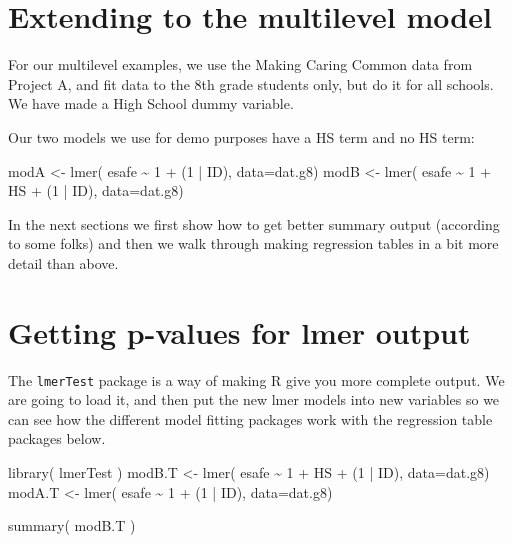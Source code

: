 \documentclass[
  letterpaper,
  DIV=11,
  numbers=noendperiod]{scrreprt}
\newenvironment{Shaded}{}{}
\newcommand{\AttributeTok}[1]{\textcolor[rgb]{0.49,0.56,0.16}{#1}}
\newcommand{\DecValTok}[1]{\textcolor[rgb]{0.25,0.63,0.44}{#1}}
\newcommand{\FunctionTok}[1]{\textcolor[rgb]{0.02,0.16,0.49}{#1}}
\newcommand{\NormalTok}[1]{#1}
\newcommand{\OtherTok}[1]{\textcolor[rgb]{0.00,0.44,0.13}{#1}}
\newcommand{\SpecialCharTok}[1]{\textcolor[rgb]{0.25,0.44,0.63}{#1}}
\begin{document}
\section{Extending to the multilevel
model}\label{extending-to-the-multilevel-model}

For our multilevel examples, we use the Making Caring Common data from
Project A, and fit data to the 8th grade students only, but do it for
all schools. We have made a High School dummy variable.

Our two models we use for demo purposes have a HS term and no HS term:

\begin{Shaded}
\begin{Highlighting}[]
\NormalTok{modA }\OtherTok{\textless{}{-}} \FunctionTok{lmer}\NormalTok{( esafe }\SpecialCharTok{\textasciitilde{}} \DecValTok{1} \SpecialCharTok{+}\NormalTok{ (}\DecValTok{1} \SpecialCharTok{|}\NormalTok{ ID), }\AttributeTok{data=}\NormalTok{dat.g8)}
\NormalTok{modB }\OtherTok{\textless{}{-}} \FunctionTok{lmer}\NormalTok{( esafe }\SpecialCharTok{\textasciitilde{}} \DecValTok{1} \SpecialCharTok{+}\NormalTok{ HS }\SpecialCharTok{+}\NormalTok{ (}\DecValTok{1} \SpecialCharTok{|}\NormalTok{ ID), }\AttributeTok{data=}\NormalTok{dat.g8)}
\end{Highlighting}
\end{Shaded}

In the next sections we first show how to get better summary output
(according to some folks) and then we walk through making regression
tables in a bit more detail than above.

\section{Getting p-values for lmer
output}\label{getting-p-values-for-lmer-output}

The \texttt{lmerTest} package is a way of making R give you more
complete output. We are going to load it, and then put the new lmer
models into new variables so we can see how the different model fitting
packages work with the regression table packages below.

\begin{Shaded}
\begin{Highlighting}[]
\FunctionTok{library}\NormalTok{( lmerTest )}
\NormalTok{modB.T }\OtherTok{\textless{}{-}} \FunctionTok{lmer}\NormalTok{( esafe }\SpecialCharTok{\textasciitilde{}} \DecValTok{1} \SpecialCharTok{+}\NormalTok{ HS }\SpecialCharTok{+}\NormalTok{ (}\DecValTok{1} \SpecialCharTok{|}\NormalTok{ ID), }\AttributeTok{data=}\NormalTok{dat.g8)}
\NormalTok{modA.T }\OtherTok{\textless{}{-}} \FunctionTok{lmer}\NormalTok{( esafe }\SpecialCharTok{\textasciitilde{}} \DecValTok{1} \SpecialCharTok{+}\NormalTok{ (}\DecValTok{1} \SpecialCharTok{|}\NormalTok{ ID), }\AttributeTok{data=}\NormalTok{dat.g8)}

\FunctionTok{summary}\NormalTok{( modB.T )}
\end{Highlighting}
\end{Shaded}
\end{document}
